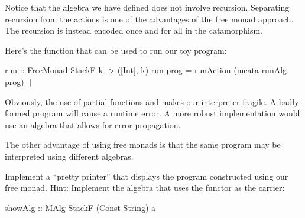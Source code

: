 \documentclass[DaoFP]{subfiles}
\begin{document}
Notice that the algebra we have defined does not involve recursion. Separating recursion from the actions is one of the advantages of the free monad approach. The recursion is instead encoded once and for all in the catamorphism. 

Here's the function that can be used to run our toy program:
\begin{haskell}
run :: FreeMonad StackF k -> ([Int], k)
run prog = runAction (mcata runAlg prog) [] 
\end{haskell}

Obviously, the use of partial functions  and  makes our interpreter fragile. A badly formed program will cause a runtime error. A more robust implementation would use an algebra that allows for error propagation.

The other advantage of using free monads is that the same program may be interpreted using different algebras.

\begin{exercise}
Implement a ``pretty printer'' that displays the program constructed using our free monad. Hint: Implement the algebra that uses the  functor as the carrier:
\begin{haskell}
showAlg :: MAlg StackF (Const String) a
\end{haskell}
\end{exercise}
\end{document}
